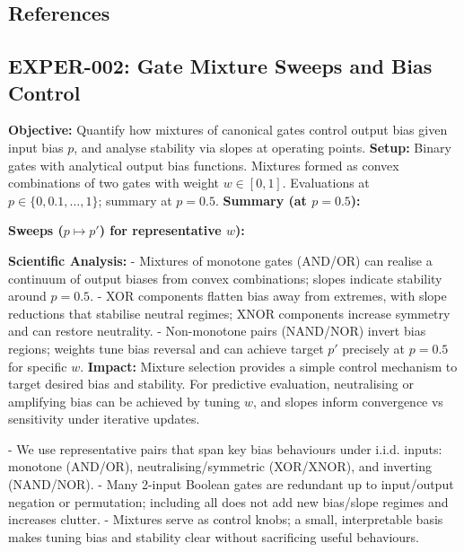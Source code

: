 \subsection{References}



\subsection{EXPER-002: Gate Mixture Sweeps and Bias Control}
\textbf{Objective:} Quantify how mixtures of canonical gates control output bias given input bias $p$, and analyse stability via slopes at operating points.
\textbf{Setup:} Binary gates with analytical output bias functions. Mixtures formed as convex combinations of two gates with weight $w\in[0,1]$. Evaluations at $p\in\{0,0.1,\dots,1\}$; summary at $p=0.5$.
\textbf{Summary (at $p=0.5$):}
\begin{center}
\end{center}
\textbf{Sweeps ($p\mapsto p'$) for representative $w$):}
\begin{center}
\end{center}
\begin{center}
\end{center}
\begin{center}
\end{center}
\textbf{Scientific Analysis:}
- Mixtures of monotone gates (AND/OR) can realise a continuum of output biases from convex combinations; slopes indicate stability around $p=0.5$.
- XOR components flatten bias away from extremes, with slope reductions that stabilise neutral regimes; XNOR components increase symmetry and can restore neutrality.
- Non-monotone pairs (NAND/NOR) invert bias regions; weights tune bias reversal and can achieve target $p'$ precisely at $p=0.5$ for specific $w$.
\textbf{Impact:} Mixture selection provides a simple control mechanism to target desired bias and stability. For predictive evaluation, neutralising or amplifying bias can be achieved by tuning $w$, and slopes inform convergence vs sensitivity under iterative updates.

- We use representative pairs that span key bias behaviours under i.i.d. inputs: monotone (AND/OR), neutralising/symmetric (XOR/XNOR), and inverting (NAND/NOR).
- Many 2-input Boolean gates are redundant up to input/output negation or permutation; including all does not add new bias/slope regimes and increases clutter.
- Mixtures serve as control knobs; a small, interpretable basis makes tuning bias and stability clear without sacrificing useful behaviours.

